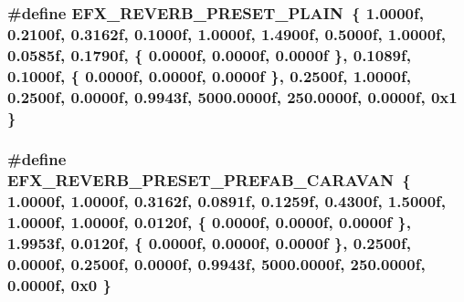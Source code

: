 \subsubsection[{\texorpdfstring{E\+F\+X\+\_\+\+R\+E\+V\+E\+R\+B\+\_\+\+P\+R\+E\+S\+E\+T\+\_\+\+P\+L\+A\+IN}{EFX_REVERB_PRESET_PLAIN}}]{\setlength{\rightskip}{0pt plus 5cm}\#define E\+F\+X\+\_\+\+R\+E\+V\+E\+R\+B\+\_\+\+P\+R\+E\+S\+E\+T\+\_\+\+P\+L\+A\+IN~\{ 1.\+0000f, 0.\+2100f, 0.\+3162f, 0.\+1000f, 1.\+0000f, 1.\+4900f, 0.\+5000f, 1.\+0000f, 0.\+0585f, 0.\+1790f, \{ 0.\+0000f, 0.\+0000f, 0.\+0000f \}, 0.\+1089f, 0.\+1000f, \{ 0.\+0000f, 0.\+0000f, 0.\+0000f \}, 0.\+2500f, 1.\+0000f, 0.\+2500f, 0.\+0000f, 0.\+9943f, 5000.\+0000f, 250.\+0000f, 0.\+0000f, 0x1 \}}\hypertarget{efx-presets_8h_a4f25fa872d6ae85b7013d23b31ab7852}{}\label{efx-presets_8h_a4f25fa872d6ae85b7013d23b31ab7852}
\subsubsection[{\texorpdfstring{E\+F\+X\+\_\+\+R\+E\+V\+E\+R\+B\+\_\+\+P\+R\+E\+S\+E\+T\+\_\+\+P\+R\+E\+F\+A\+B\+\_\+\+C\+A\+R\+A\+V\+AN}{EFX_REVERB_PRESET_PREFAB_CARAVAN}}]{\setlength{\rightskip}{0pt plus 5cm}\#define E\+F\+X\+\_\+\+R\+E\+V\+E\+R\+B\+\_\+\+P\+R\+E\+S\+E\+T\+\_\+\+P\+R\+E\+F\+A\+B\+\_\+\+C\+A\+R\+A\+V\+AN~\{ 1.\+0000f, 1.\+0000f, 0.\+3162f, 0.\+0891f, 0.\+1259f, 0.\+4300f, 1.\+5000f, 1.\+0000f, 1.\+0000f, 0.\+0120f, \{ 0.\+0000f, 0.\+0000f, 0.\+0000f \}, 1.\+9953f, 0.\+0120f, \{ 0.\+0000f, 0.\+0000f, 0.\+0000f \}, 0.\+2500f, 0.\+0000f, 0.\+2500f, 0.\+0000f, 0.\+9943f, 5000.\+0000f, 250.\+0000f, 0.\+0000f, 0x0 \}}\hypertarget{efx-presets_8h_aefbedf6a5b1126fe8108bc169192c889}{}\label{efx-presets_8h_aefbedf6a5b1126fe8108bc169192c889}
